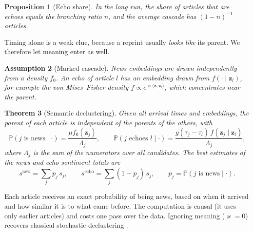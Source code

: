 \documentclass[11pt,a4paper]{article}
\theoremstyle{sci}
\newtheorem{theorem}{Theorem}[section]
\newtheorem{proposition}[theorem]{Proposition}
\theoremstyle{scidef}
\newtheorem{assumption}[theorem]{Assumption}
\newcommand{\Prob}{\mathbb{P}}
\newcommand{\z}{\bm{z}}
\begin{document}
\begin{proposition}[Echo share]\label{prop:branching}
In the long run, the share of articles that are echoes equals the branching ratio $n$, and the average cascade has $(1-n)^{-1}$ articles.
\end{proposition}

Timing alone is a weak clue, because a reprint usually \emph{looks like} its parent. We therefore let meaning enter as well.

\begin{assumption}[Marked cascade]\label{ass:marked}
News embeddings are drawn independently from a density $f_0$. An echo of article $l$ has an embedding drawn from $f(\cdot\mid\z_l)$, for example the von Mises--Fisher density $f\propto e^{\varkappa\langle\z,\z_l\rangle}$, which concentrates near the parent.
\end{assumption}

\begin{theorem}[Semantic declustering]\label{thm:semantic}
Given all arrival times and embeddings, the parent of each article is independent of the parents of the others, with
\[
  \Prob(\text{$j$ is news}\mid\cdot)=\frac{\mu f_0(\z_j)}{\Lambda_j},\qquad
  \Prob(\text{$j$ echoes $l$}\mid\cdot)=\frac{g(\tau_j-\tau_l)\,f(\z_j\mid\z_l)}{\Lambda_j},
\]
where $\Lambda_j$ is the sum of the numerators over all candidates. The best estimates of the news and echo sentiment totals are
\[
  s^{\mathrm{new}}=\sum_jp_j\,s_j,\qquad s^{\mathrm{echo}}=\sum_j(1-p_j)\,s_j,\qquad p_j=\Prob(\text{$j$ is news}\mid\cdot).
\]
\end{theorem}

\begin{inwords}
Each article receives an exact probability of being news, based on when it arrived and how similar it is to what came before. The computation is causal (it uses only earlier articles) and costs one pass over the data. Ignoring meaning ($\varkappa=0$) recovers classical stochastic declustering \citep{zhuang2002}.
\end{inwords}
\end{document}
